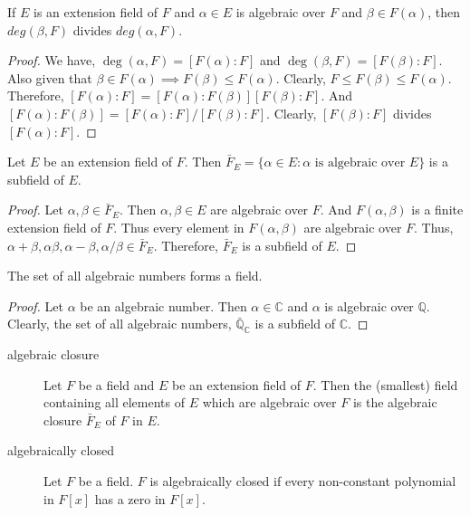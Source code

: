 \begin{corollary}
	If $E$ is an extension field of $F$ and $\alpha \in E$ is algebraic over $F$ and $\beta \in F(\alpha)$, then $deg(\beta,F)$ divides $deg(\alpha,F)$.
\end{corollary}
\begin{proof}
	We have, $\deg(\alpha,F) = [F(\alpha) : F]$ and $\deg(\beta,F) = [F(\beta):F]$. Also given that $\beta \in F(\alpha) \implies F(\beta) \le F(\alpha)$. Clearly, $F \le F(\beta) \le F(\alpha)$. Therefore, $[F(\alpha) : F] = [F(\alpha):F(\beta)][F(\beta):F]$. And $[F(\alpha):F(\beta)] = [F(\alpha):F]/[F(\beta):F]$. Clearly, $[F(\beta):F]$ divides $[F(\alpha):F]$.
\end{proof}

\begin{theorem}
	Let $E$ be an extension field of $F$. Then $\bar{F}_E = \{ \alpha \in E : \alpha \text{ is algebraic over } E \}$ is a subfield of $E$.
\end{theorem}
\begin{proof}
	Let $\alpha,\beta \in \bar{F}_E$. Then $\alpha,\beta \in E$ are algebraic over $F$. And $F(\alpha,\beta)$ is a finite extension field of $F$. Thus every element in $F(\alpha,\beta)$ are algebraic over $F$. Thus, $\alpha+\beta, \alpha\beta,\alpha-\beta,\alpha/\beta \in \bar{F}_E$. Therefore, $\bar{F}_E$ is a subfield of $E$.
\end{proof}

\begin{corollary}
	The set of all algebraic numbers forms a field.
\end{corollary}
\begin{proof}
	Let $\alpha$ be an algebraic number. Then $\alpha \in \mathbb{C}$ and $\alpha$ is algebraic over $\mathbb{Q}$. Clearly, the set of all algebraic numbers, $\bar{\mathbb{Q}}_\mathbb{C}$ is a subfield of $\mathbb{C}$.
\end{proof}

\begin{description}
	\item[algebraic closure] Let $F$ be a field and $E$ be an extension field of $F$. Then the (smallest) field containing all elements of $E$ which are algebraic over $F$ is the algebraic closure $\bar{F}_E$ of $F$ in $E$.
	\item[algebraically closed] Let $F$ be a field. $F$ is algebraically closed if every non-constant polynomial in $F[x]$ has a zero in $F[x]$.
		
\end{description}

